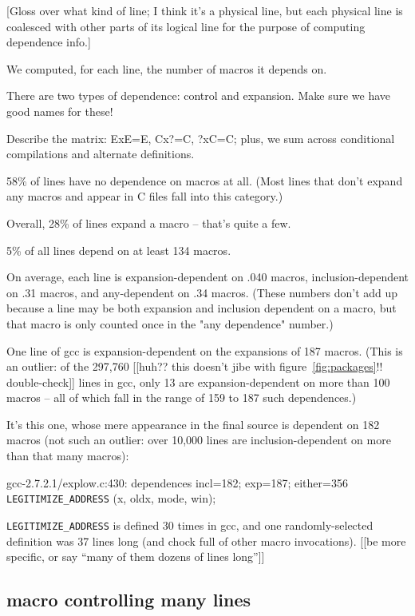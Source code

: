 \documentclass[10pt]{article}
\begin{document}
    [Gloss over what kind of line; I think it's a physical line, but each
      physical line is coalesced with other parts of its logical line for
      the purpose of computing dependence info.]

    We computed, for each line, the number of macros it depends on.

There are two types of dependence:  control and expansion.  Make sure we
have good names for these!

    Describe the matrix:  ExE=E, Cx?=C, ?xC=C; plus, we sum across
      conditional compilations and alternate definitions.

    
      58\% of lines have no dependence on macros at all.  (Most lines that
      don't expand any macros and appear in C files fall into this category.)

    Overall, 28\% of lines expand a macro -- that's quite a few.

    5\% of all lines depend on at least 134 macros.

    On average, each line is expansion-dependent on .040 macros,
      inclusion-dependent on .31 macros, and any-dependent on .34 macros.
      (These numbers don't add up because a line may be both expansion and
      inclusion dependent on a macro, but that macro is only counted once
      in the "any dependence" number.)
      
      One line of gcc is expansion-dependent on the expansions of 187
      macros.  (This is an outlier: of the 297,760 [[huh?? this doesn't
      jibe with figure~\ref{fig:packages}!!  double-check]] lines in gcc,
      only 13 are expansion-dependent on more than 100 macros -- all of
      which fall in the range of 159 to 187 such dependences.)

        It's this one, whose mere appearance in the final source is
        dependent on 182 macros (not such an outlier: over 10,000 lines are
        inclusion-dependent on more than that many macros):

        gcc-2.7.2.1/explow.c:430: dependences incl=182; exp=187; either=356
              \verb|LEGITIMIZE_ADDRESS| (x, oldx, mode, win);

        \verb|LEGITIMIZE_ADDRESS| is defined 30 times in gcc, and one randomly-selected
        definition was 37 lines long (and chock full of other macro invocations).
        [[be more specific, or say ``many of them dozens of lines long'']]

\subsection{macro controlling many lines}
\end{document}
